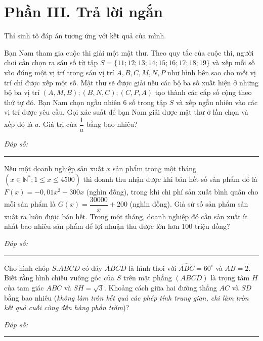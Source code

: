 \documentclass{exam}
\begin{document}
\section*{Phần III. Trả lời ngắn}
{\footnotesize Thí sinh tô đáp án tương ứng với kết quả của mình.}



\begin{question}
Bạn Nam tham gia cuộc thi giải một mật thư. Theo quy tắc của cuộc thi, người chơi cần chọn ra sáu số từ tập $S=\{11; 12; 13; 14; 15; 16; 17; 18; 19\}$ và xếp mỗi số vào đúng một vị trí trong sáu vị trí $A, B, C, M, N, P$ như hình bên sao cho mỗi vị trí chỉ được xếp một số. Mật thư sẽ được giải nếu các bộ ba số xuất hiện ở những bộ ba vị trí $(A, M, B);(B, N, C);(C, P, A)$ tạo thành các cấp số cộng theo thứ tự đó. Bạn Nam chọn ngẫu nhiên $6$ số trong tập $S$ và xếp ngẫu nhiên vào các vị trí được yêu cầu. Gọi xác suất để bạn Nam giải được mật thư ở lần chọn và xếp đó là $a$. Giá trị của $\dfrac{1}{a}$ bằng bao nhiêu?

\begin{center}\end{center}
\par\vspace{0.25em}
\noindent\textit{Đáp số:}\ \rule{4.2cm}{0.4pt}
\end{question}





\begin{question}
Nếu một doanh nghiệp sản xuất $x$ sản phẩm trong một tháng $\left(x \in \mathbb{N}^*; 1 \leq x \leq 4500\right)$ thì doanh thu nhận được khi bán hết số sản phẩm đó là $F(x)=-0,01x^2+300x$ (nghìn đồng), trong khi chi phí sản xuất bình quân cho mỗi sản phẩm là $G(x)=\dfrac{30000}{x}+200$ (nghìn đồng). Giả sử số sản phẩm sản xuât ra luôn được bán hết. Trong một tháng, doanh nghiệp đó cần sản xuất ít nhất bao nhiêu sản phẩm để lợi nhuận thu được lớn hơn $100$ triệu đồng?
\par\vspace{0.25em}
\noindent\textit{Đáp số:}\ \rule{4.2cm}{0.4pt}
\end{question}





\begin{question}
Cho hình chóp $S.ABCD$ có đáy $ABCD$ là hình thoi với $\widehat{ABC}=60^{\circ}$ và $AB=2$. Biết rằng hình chiếu vuông góc của $S$ trên mặt phẳng $(ABCD)$ là trọng tâm $H$ của tam giác $ABC$ và $SH=\sqrt{3}$. Khoảng cách giữa hai đường thẳng $AC$ và $SD$ bằng bao nhiêu (\textit{không làm tròn kết quả các phép tính trung gian, chi làm tròn kết quả cuối cùng đến hàng phần trăm})?
\par\vspace{0.25em}
\noindent\textit{Đáp số:}\ \rule{4.2cm}{0.4pt}
\end{question}
\end{document}

